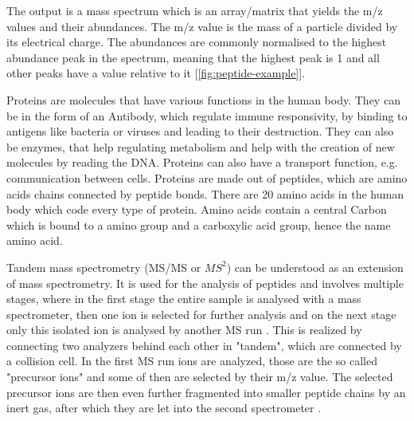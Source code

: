 \documentclass[11pt]{article}
\begin{document}
The output is a mass spectrum which is an array/matrix that yields the m/z values and their abundances. The m/z value is the mass of a particle divided by its electrical charge. The abundances are commonly normalised to the highest abundance peak in the spectrum, meaning that the highest peak is 1 and all other peaks have a value relative to it [\cref{fig:peptide-example}]. 

Proteins are molecules that have various functions in the human body. They can be in the form of an Antibody, which regulate immune responsivity, by binding to antigens like bacteria or viruses and leading to their destruction. They can also be enzymes, that help regulating metabolism and help with the creation of new molecules by reading the DNA. Proteins can also have a transport function, e.g. communication between cells. Proteins are made out of peptides, which are amino acids chains connected by peptide bonds. There are 20 amino acids in the human body which code every type of protein. Amino acids contain a central Carbon which is bound to a amino group and a carboxylic acid group, hence the name amino acid. 

Tandem mass spectrometry (MS/MS or \(MS^2\)) can be understood as an extension of mass spectrometry. It is used for the analysis of peptides and involves multiple stages, where in the first stage the entire sample is analysed with a mass spectrometer, then one ion is selected for further analysis and on the next stage only this isolated ion is analysed by another MS run \cite{tandem-mass-spectrometry}. This is realized by connecting two analyzers behind each other in "tandem", which are connected by a collision cell. In the first MS run ions are analyzed, those are the so called "precursor ions" and some of then are selected by their m/z value. The selected precursor ions are then even further fragmented into smaller peptide chains by an inert gas, after which they are let into the second spectrometer \cite{tandem-mass-spec-deutsch, tandem-mass-spec-yt}.
\end{document}
